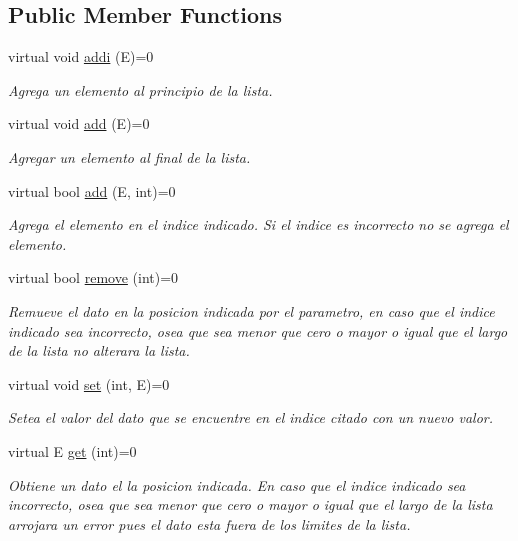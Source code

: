\subsection*{Public Member Functions}
\begin{DoxyCompactItemize}
\item 
virtual void \hyperlink{class_i_list_af202dc9e748ee32238d80e57dfbcae20}{addi} (E)=0
\begin{DoxyCompactList}\small\item\em Agrega un elemento al principio de la lista. \end{DoxyCompactList}\item 
virtual void \hyperlink{class_i_list_a27500caa3d9da05aa6437d5ff56b09e2}{add} (E)=0
\begin{DoxyCompactList}\small\item\em Agregar un elemento al final de la lista. \end{DoxyCompactList}\item 
virtual bool \hyperlink{class_i_list_a70140dbc9de2b9f6e5ffd2212d5ea8b0}{add} (E, int)=0
\begin{DoxyCompactList}\small\item\em Agrega el elemento en el indice indicado. Si el indice es incorrecto no se agrega el elemento. \end{DoxyCompactList}\item 
virtual bool \hyperlink{class_i_list_a9bf7d737252dfbd4c9a5d7be36ea4231}{remove} (int)=0
\begin{DoxyCompactList}\small\item\em Remueve el dato en la posicion indicada por el parametro, en caso que el indice indicado sea incorrecto, osea que sea menor que cero o mayor o igual que el largo de la lista no alterara la lista. \end{DoxyCompactList}\item 
virtual void \hyperlink{class_i_list_a119ed658d2804aec0b9fef9325c03073}{set} (int, E)=0
\begin{DoxyCompactList}\small\item\em Setea el valor del dato que se encuentre en el indice citado con un nuevo valor. \end{DoxyCompactList}\item 
virtual E \hyperlink{class_i_list_a60570f7ee0e7474d01b2f364bad996a0}{get} (int)=0
\begin{DoxyCompactList}\small\item\em Obtiene un dato el la posicion indicada. En caso que el indice indicado sea incorrecto, osea que sea menor que cero o mayor o igual que el largo de la lista arrojara un error pues el dato esta fuera de los limites de la lista. \end{DoxyCompactList}\item 

\end{DoxyCompactItemize}
